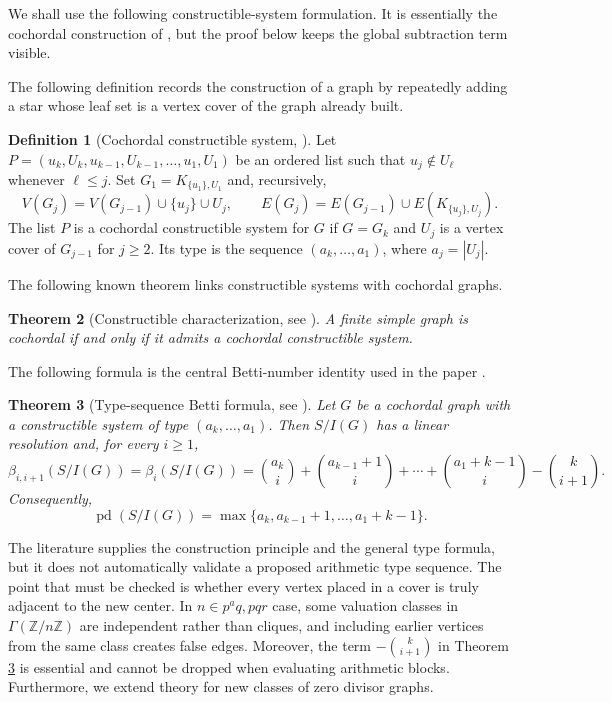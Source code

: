 \documentclass[12pt]{article}
\newtheorem{theorem}{Theorem}[section]
\theoremstyle{definition}
\newtheorem{definition}[theorem]{Definition}
\begin{document}
\medskip

We shall use the following constructible-system formulation.  It is essentially the cochordal construction of \cite{DungVu2026}, but the proof below keeps the global subtraction term visible.

\medskip

\noindent The following definition records the construction of a graph by repeatedly adding a star whose leaf set is a vertex cover of the graph already built.
\begin{definition}[Cochordal constructible system, \cite{DungVu2026}]\label{def:constructible}
Let $P=(u_k,U_k,u_{k-1},U_{k-1},\ldots,u_1,U_1)$ be an ordered list such that $u_j\notin U_{\ell}$ whenever $\ell\leq j$.  Set $G_1=K_{\{u_1\},U_1}$ and, recursively,
$$
V(G_j)=V(G_{j-1})\cup \{u_j\}\cup U_j,
\qquad
E(G_j)=E(G_{j-1})\cup E(K_{\{u_j\},U_j}).
$$
The list $P$ is a cochordal constructible system for $G$ if $G=G_k$ and $U_j$ is a vertex cover of $G_{j-1}$ for $j\geq 2$.  Its type is the sequence $(a_k,\ldots,a_1)$, where $a_j=|U_j|$.
\end{definition}

\medskip

\noindent The following known theorem links constructible systems with cochordal graphs.
\begin{theorem}[Constructible characterization, see \cite{DungVu2026}]\label{thm:constructible-characterization}
A finite simple graph is cochordal if and only if it admits a cochordal constructible system.
\end{theorem}

\medskip

\noindent The following formula is the central Betti-number identity used in the paper \cite{DungVu2026}.
\begin{theorem}[Type-sequence Betti formula, see \cite{DungVu2026}]\label{thm:type-formula}
Let $G$ be a cochordal graph with a constructible system of type $(a_k,\ldots,a_1)$.  Then $S/I(G)$ has a linear resolution and, for every $i\geq 1$,
$$
\beta_{i,i+1}(S/I(G))=\beta_i(S/I(G))=\binom{a_k}{i}+\binom{a_{k-1}+1}{i}+\cdots+\binom{a_1+k-1}{i}-\binom{k}{i+1}.
$$
Consequently,
$$
\operatorname{pd}(S/I(G))=\max\{a_k,a_{k-1}+1,\ldots,a_1+k-1\}.
$$
\end{theorem}

\medskip

The literature supplies the construction principle and the general type formula, but it does not automatically validate a proposed arithmetic type sequence.  The point that must be checked is whether every vertex placed in a cover is truly adjacent to the new center.  In $n\in {p^a q, pqr}$ case, some valuation classes in $\Gamma(\mathbb{Z}/n\mathbb{Z})$ are independent rather than cliques, and including earlier vertices from the same class creates false edges.  Moreover, the term $-\binom{k}{i+1}$ in Theorem \ref{thm:type-formula} is essential and cannot be dropped when evaluating arithmetic blocks. Furthermore, we extend theory for new classes of zero divisor graphs.
\end{document}
